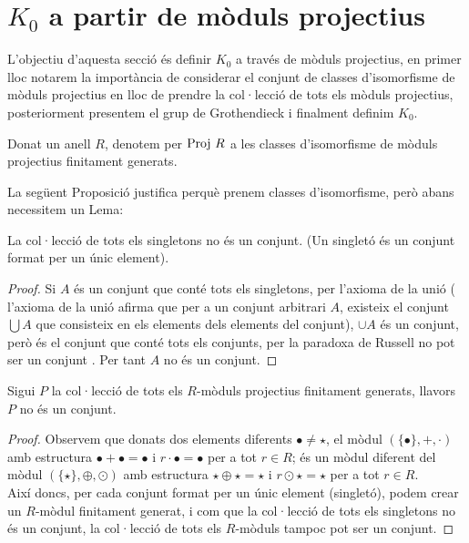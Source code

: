 \label{Chapter1} %


\newcommand{\keyword}[1]{\textbf{#1}}
\newcommand{\tabhead}[1]{\textbf{#1}}
\newcommand{\code}[1]{\texttt{#1}}
\newcommand{\file}[1]{\texttt{\bfseries#1}}
\newcommand{\option}[1]{\texttt{\itshape#1}}



\section{$K_0$ a partir de mòduls projectius}
L'objectiu d'aquesta secció és definir $K_0$ a través de mòduls projectius, en primer lloc notarem la importància de considerar el conjunt de classes d'isomorfisme de mòduls projectius en lloc de prendre la col·lecció de tots els mòduls projectius, posteriorment presentem el grup de Grothendieck i finalment definim $K_0$.
\begin{definition}
Donat un anell $R$, denotem per $\mathrm{Proj} \  R$ a les classes d'isomorfisme de mòduls projectius finitament generats. 
\end{definition}
La següent Proposició justifica perquè prenem classes d'isomorfisme, però abans necessitem un Lema:
\begin{lema}
La col·lecció de tots els singletons no és un conjunt. (Un singletó és un conjunt format per un únic element).
\end{lema}
\begin{proof}
Si $A$ és un conjunt que conté tots els singletons, per l'axioma de la unió ( l'axioma de la unió afirma que per a un conjunt arbitrari $A$, existeix el conjunt $\bigcup A$ que consisteix en els elements dels elements del conjunt), $\cup A$ és un conjunt, però és el conjunt que conté tots els conjunts, per la paradoxa de Russell no pot ser un conjunt . Per tant $A$ no és un conjunt.
\end{proof}

\begin{prop}
Sigui $P$ la col·lecció de tots els $R$-mòduls projectius finitament generats, llavors $P$ no és un conjunt.
\end{prop}
\begin{proof}
Observem que donats dos elements diferents  $\bullet \neq \star$, el mòdul $(\{\bullet\},+,\cdot)$ amb estructura $\bullet+\bullet=\bullet$ i $r \cdot \bullet = \bullet$ per a tot $r\in R$; és un mòdul diferent del mòdul $(\{\star\},\oplus,\odot)$ amb estructura $\star \oplus \star = \star$ i $r\odot \star=\star$ per a tot $r\in R$.
\\
Així doncs, per cada conjunt format per un únic element (singletó), podem crear un $R$-mòdul finitament generat, i com que la col·lecció de tots els singletons no és un conjunt, la col·lecció de tots els $R$-mòduls tampoc pot ser un conjunt.
\end{proof}

